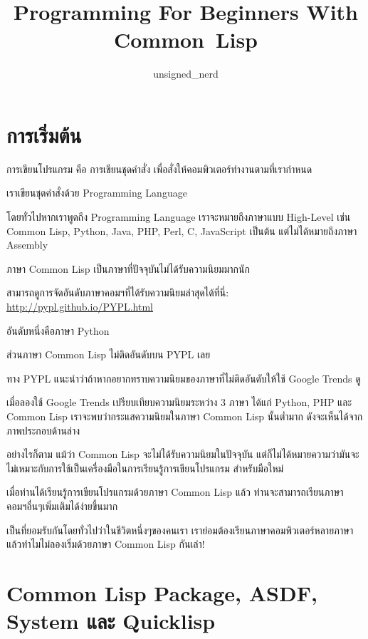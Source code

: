 \documentclass[a4paper]{article}
\begin{document}
\title{Programming For Beginners With Common~Lisp}
\author{unsigned\_nerd}
\maketitle

\tableofcontents

\section{การเริ่มต้น}

การเขียนโปรแกรม คือ การเขียนชุดคำสั่ง เพื่อสั่งให้คอมพิวเตอร์ทำงานตามที่เรากำหนด

เราเขียนชุดคำสั่งด้วย Programming Language

โดยทั่วไปหากเราพูดถึง Programming Language เราจะหมายถึงภาษาแบบ High-Level เช่น
Common Lisp, Python, Java, PHP, Perl, C, JavaScript เป็นต้น
แต่ไม่ได้หมายถึงภาษา Assembly

ภาษา Common Lisp เป็นภาษาที่ปัจจุบันไม่ได้รับความนิยมมากนัก

สามารถดูการจัดอันดับภาษาคอมฯที่ได้รับความนิยมล่าสุดได้ที่นี่: \href{http://pypl.github.io/PYPL.html}{http://pypl.github.io/PYPL.html}

อันดับหนึ่งคือภาษา Python

ส่วนภาษา Common Lisp ไม่ติดอันดับบน PYPL เลย

ทาง PYPL แนะนำว่าถ้าหากอยากทราบความนิยมของภาษาที่ไม่ติดอันดับให้ใช้ Google Trends ดู

เมื่อลองใช้ Google Trends เปรียบเทียบความนิยมระหว่าง 3 ภาษา ได้แก่ Python, PHP
และ Common Lisp เราจะพบว่ากระแสความนิยมในภาษา Common Lisp นั้นต่ำมาก
ดังจะเห็นได้จากภาพประกอบด้านล่าง


อย่างไรก็ตาม แม้ว่า Common Lisp จะไม่ได้รับความนิยมในปัจจุบัน
แต่ก็ไม่ได้หมายความว่ามันจะไม่เหมาะกับการใช้เป็นเครื่องมือในการเรียนรู้การเขียนโปรแกรม%
สำหรับมือใหม่

เมื่อท่านได้เรียนรู้การเขียนโปรแกรมด้วยภาษา Common Lisp แล้ว ท่านจะสามารถเรียนภาษา%
คอมฯอื่นๆเพิ่มเติมได้ง่ายขึ้นมาก

เป็นที่ยอมรับกันโดยทั่วไปว่าในชีวิตหนึ่งๆของคนเรา เราย่อมต้องเรียนภาษาคอมพิวเตอร์หลายภาษา
แล้วทำไมไม่ลองเริ่มด้วยภาษา Common Lisp กันเล่า!


\section{Common Lisp Package, ASDF, System และ Quicklisp}
\end{document}
